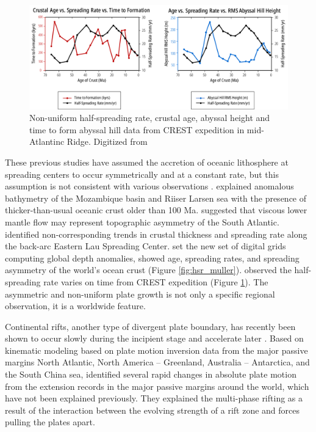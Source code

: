 \documentclass[letterpaper,12pt,notitle]{memphisthesis}                     %
\begin{document}
\begin{figure}[!htb]
	\centering
	\includegraphics[width=0.99\linewidth]{./figs/hsrgraph1.pdf}
	\caption{Non-uniform half-spreading rate, crustal age, abyssal height and time to form abyssal hill data from CREST expedition in mid-Atlantinc Ridge. Digitized from \citet{Fedotova2017}}
	\label{fig:hsr_fedotova}
\end{figure}

 These previous studies have assumed the accretion of oceanic lithosphere at spreading centers to occur symmetrically and at a constant rate, but this assumption is not consistent with various observations \citep{Castelino2016, Flament2014, Martinez2006, Muller1998, Muller2008, Fedotova2017}. \citet{Castelino2016} explained anomalous bathymetry of the Mozambique basin and Riiser Larsen sea with the presence of thicker-than-usual oceanic crust older than 100 Ma. \citet{Flament2014} suggested that viscous lower mantle flow may represent topographic asymmetry of the South Atlantic. \citet{Martinez2006} identified non-corresponding trends in crustal thickness and spreading rate along the back-arc Eastern Lau Spreading Center. \citet{Muller2008} set the new set of digital grids computing global depth anomalies, showed age, spreading rates, and spreading asymmetry of the world’s ocean crust (Figure \ref{fig:hsr_muller}). \citet{Fedotova2017} observed the half-spreading rate varies on time from CREST expedition (Figure \ref{fig:hsr_fedotova}). The asymmetric and non-uniform plate growth is not only a specific regional observation, it is a worldwide feature.

Continental rifts, another type of divergent plate boundary, has recently been shown to occur slowly during the incipient stage and accelerate later \citep{Brune2016}. Based on kinematic modeling based on plate motion inversion data from the major passive margins North Atlantic, North America – Greenland, Australia – Antarctica, and the South China sea, \citet{Brune2016} identified several rapid changes in absolute plate motion from the extension records in the major passive margins around the world, which have not been explained previously. They explained the multi-phase rifting as a result of the interaction between the evolving strength of a rift zone and forces pulling the plates apart.
\end{document}
